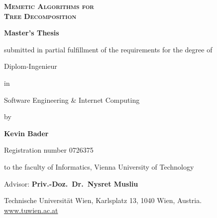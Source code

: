 \documentclass[thesis.tex]{subfiles}
\begin{document}
{

\vspace{3\baselineskip}
\begin{center}
   \bfseries\scshape\HUGE
   Memetic Algorithms for\\
   Tree Decomposition
\end{center}

\bigskip
\begin{center}
   \bfseries\LARGE
   Master's Thesis
\end{center}

\smallskip
\begin{center}
   submitted in partial fulfillment of the requirements for the degree of
\end{center}

\smallskip
\begin{center}
   \LARGE
   Diplom-Ingenieur
\end{center}

\smallskip
\begin{center}
   in
\end{center}

\smallskip
\begin{center}
   \LARGE
   Software Engineering \& Internet Computing
\end{center}

\smallskip
\begin{center}
   by
\end{center}

\smallskip
\begin{center}
   \LARGE\bfseries
   Kevin Bader
\end{center}
\begin{center}
   Registration number 0726375
\end{center}

\smallskip
\begin{center}
   to the faculty of Informatics, Vienna University of Technology
\end{center}

\smallskip
\begin{center}
   Advisor: \textbf{Priv.-Doz.\ Dr.\ Nysret Musliu}
\end{center}

\vspace{4\baselineskip}
\footnotesize
\begin{center}
   Technische Universität Wien, Karlsplatz 13, 1040 Wien, Austria. \href{www.tuwien.ac.at}{www.tuwien.ac.at}
\end{center}

}

\restoregeometry
\end{document}
